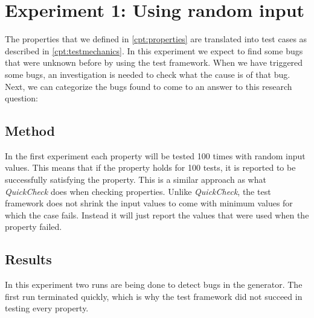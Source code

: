 \chapter{Experiment 1: Using random input}
\label{cpt:experiment1}
The properties that we defined in \autoref{cpt:properties} are translated into
test cases as described in \autoref{cpt:testmechanics}. In this experiment we
expect to find some bugs that were unknown before by using the test framework.
When we have triggered some bugs, an investigation is needed to check what the
cause is of that bug. Next, we can categorize the bugs found to come to an
answer to this research question:\rqThree{}

\section{Method}
In the first experiment each property will be tested 100 times with random input
values. This means that if the property holds for 100 tests, it is reported to be successfully satisfying the property. This is a similar approach as what \textit{QuickCheck} does when
checking properties. Unlike \textit{QuickCheck}, the test framework does not shrink the input values to come with minimum values for which the case fails. Instead it will just report the values that were used when the property failed.

\section{Results}
In this experiment two runs are being done to detect bugs in the generator. The
first run terminated quickly, which is why the test framework did not succeed in
testing every property.

